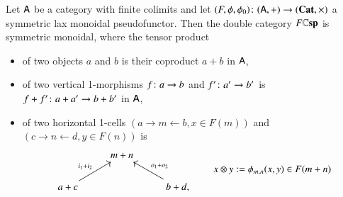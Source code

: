 \documentclass[reqno]{amsart}
\begin{document}
\begin{thm}\label{DC}
Let $\mathsf{A}$ be a category with finite colimits and let $(F,\phi,\phi_0)\colon (\mathsf{A},+) \to (\mathbf{Cat},\times)$ a symmetric lax monoidal pseudofunctor. Then the double category $F\mathbf{\mathbb Csp}$ is symmetric monoidal, where the tensor product
\begin{itemize}
\item of two objects $a$ and $b$ is their coproduct $a+b$ in $\mathsf{A}$,
\item of two vertical 1-morphisms $f \colon a \to b$ and $f' \colon a' \to b'$ is $f+f' \colon a+a' \to b+b'$ in $\mathsf{A}$,
\item of two horizontal 1-cells $(a \to m \leftarrow b ,x \in F(m))$ and $(c \to n \leftarrow d, y\in F(n))$ is
\begin{equation}\label{eq:tensordecoration}
\begin{tikzcd}
& m+n & \\
a+c\ar[ur,"i_1+i_2"] && b+d,\ar[ul,"o_1+o_2"']
\end{tikzcd}\qquad x \otimes y:=  \phi_{m,n}(x,y) \in F(m + n) 
\end{equation}

\begin{comment}
\begin{equation}\label{eq:tensordecoration}
\begin{tikzcd}
& m_1+m_2 & \\
a_1+a_2\ar[ur,"i_1+i_2"] && b_1+b_2,\ar[ul,"o_1+o_2"']
\end{tikzcd}\qquad x_1\otimes x_2:=\one \xrightarrow{x_1\times x_2}F(m_1)\times F(m_2)\xrightarrow{\phi_{m_1,m_2}}F(m_1+m_2)
\end{equation}
\end{comment}


\end{itemize}
\end{thm}
\end{document}

